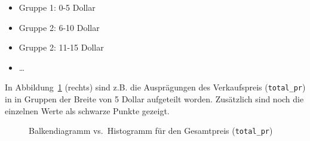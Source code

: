 \documentclass[
  letterpaper,
  oneside,
  open=any]{scrbook}
\providecommand{\tightlist}{%
  \setlength{\itemsep}{0pt}\setlength{\parskip}{0pt}}\usepackage{longtable,booktabs,array}
\theoremstyle{definition}
\theoremstyle{definition}
\theoremstyle{definition}
\theoremstyle{remark}
\begin{document}
\begin{itemize}
\tightlist
\item
  Gruppe 1: 0-5 Dollar
\item
  Gruppe 2: 6-10 Dollar
\item
  Gruppe 2: 11-15 Dollar
\item
  \ldots{}
\end{itemize}

In Abbildung~\ref{fig-balken-hist} (rechts) sind z.B. die Ausprägungen
des Verkaufspreis (\texttt{total\_pr}) in in Gruppen der Breite von 5
Dollar aufgeteilt worden. Zusätzlich sind noch die einzelnen Werte als
schwarze Punkte gezeigt.

\begin{figure}

\begin{minipage}{0.50\linewidth}



\end{minipage}%
%
\begin{minipage}{0.50\linewidth}



\end{minipage}%

\caption{\label{fig-balken-hist}Balkendiagramm vs.~Histogramm für den
Gesamtpreis (\texttt{total\_pr})}

\end{figure}%
\end{document}
